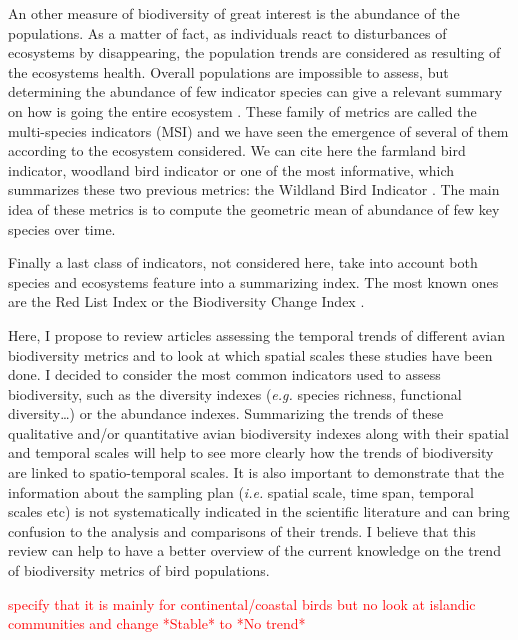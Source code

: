 \documentclass[
  12pt,
  oneside]{report}
\begin{document}
An other measure of biodiversity of great interest is the abundance of the populations. As a matter of fact, as individuals react to disturbances of ecosystems by disappearing, the population trends are considered as resulting of the ecosystems health. Overall populations are impossible to assess, but determining the abundance of few indicator species can give a relevant summary on how is going the entire ecosystem \autocite{gregory_developing_2005}. These family of metrics are called the multi-species indicators (MSI) and we have seen the emergence of several of them according to the ecosystem considered. We can cite here the farmland bird indicator, woodland bird indicator or one of the most informative, which summarizes these two previous metrics: the Wildland Bird Indicator \autocite{gregory_generation_1999,gregory_wild_2010}. The main idea of these metrics is to compute the geometric mean of abundance of few key species over time.

Finally a last class of indicators, not considered here, take into account both species and ecosystems feature into a summarizing index. The most known ones are the Red List Index \autocite{butchart_improvements_2007,butchart_using_2005,butchart_measuring_2004} or the Biodiversity Change Index \autocite{normander_indicator_2012}.

Here, I propose to review articles assessing the temporal trends of different avian biodiversity metrics and to look at which spatial scales these studies have been done. I decided to consider the most common indicators used to assess biodiversity, such as the diversity indexes (\emph{e.g.} species richness, functional diversity\ldots) or the abundance indexes. Summarizing the trends of these qualitative and/or quantitative avian biodiversity indexes along with their spatial and temporal scales will help to see more clearly how the trends of biodiversity are linked to spatio-temporal scales. It is also important to demonstrate that the information about the sampling plan (\emph{i.e.} spatial scale, time span, temporal scales etc) is not systematically indicated in the scientific literature and can bring confusion to the analysis and comparisons of their trends. I believe that this review can help to have a better overview of the current knowledge on the trend of biodiversity metrics of bird populations.

\textcolor{red}{specify that it is mainly for continental/coastal birds but no look at  islandic communities and change *Stable* to *No trend*}
\end{document}
